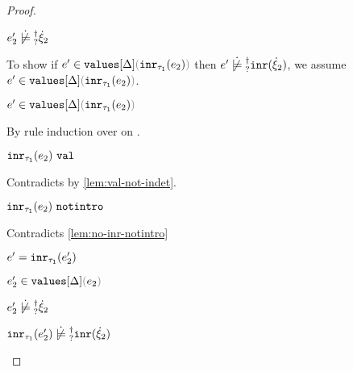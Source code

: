 \begin{proof}
\begin{byCases}
\begin{byCases}
\begin{byCases}
\begin{byCases}
\begin{pfsteps*}
              $\cnotsatisfyormay{e_2'}{\hxi_2}$  
            \end{pfsteps*}
            To show if $\inValues{e'}{\Delta}{\hinr{\tau_1}{e_2}}$ then
            $\cnotsatisfyormay{e'}{\cinr{\hxi_2}}$, we assume
            $\inValues{e'}{\Delta}{\hinr{\tau_1}{e_2}}$.
            \begin{pfsteps*}
            \item $\inValues{e'}{\Delta}{\hinr{\tau_1}{e_2}}$ 
            \end{pfsteps*}
            By rule induction over  on
            .
            \begin{byCases}
            \item[\text{(\ref{rule:IVVal})}]
              \begin{pfsteps*}
              \item $\mathtt{inr}_{\tau_1}({e_2}) ~\mathtt{val}$ 
              \end{pfsteps*}
              Contradicts  by \autoref{lem:val-not-indet}.
            \item[\text{(\ref{rule:IVIndet})}]
              \begin{pfsteps*}
              \item $\mathtt{inr}_{\tau_1}({e_2}) ~\mathtt{notintro}$ 
              \end{pfsteps*}
              Contradicts \autoref{lem:no-inr-notintro} 
            \item[\text{(\ref{rule:IVInr})}]
              \begin{pfsteps*}
              \item $e'=\mathtt{inr}_{\tau_1}({e_2'})$ 
              \item $\inValues{e_2'}{\Delta}{e_2}$ 
              \item $\cnotsatisfyormay{e_2'}{\hxi_2}$  
              \item $\cnotsatisfyormay{\hinr{\tau_1}{e_2'}}{\cinr{\hxi_2}}$

\end{pfsteps*}
\end{byCases}
\end{byCases}
\end{byCases}
\end{byCases}
\end{byCases}
\end{proof}
